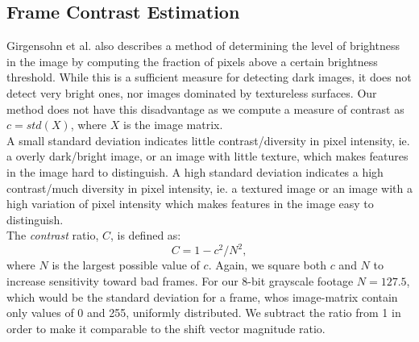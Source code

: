 \subsection{Frame Contrast Estimation}\label{sec:frame_contrast_estimation}
%
Girgensohn et al.\cite{Girgensohn:2000:SAH:354401.354415} also describes a method of determining the level of brightness in the image by computing the fraction of pixels above a certain brightness threshold. While this is a sufficient measure for detecting dark images, it does not detect very bright ones, nor images dominated by textureless surfaces. Our method does not have this disadvantage as we compute a measure of contrast as $c = std(X)$, where $X$ is the image matrix.\\
A small standard deviation indicates little contrast/diversity in pixel intensity, ie. a overly dark/bright image, or an image with little texture, which makes features in the image hard to distinguish. A high standard deviation indicates a high contrast/much diversity in pixel intensity, ie. a textured image or an image with a high variation of pixel intensity which makes features in the image easy to distinguish.\\
%
The \textit{contrast} ratio, $C$, is defined as:
\[
C = 1 - c^2 / N^2,
\]
where $N$ is the largest possible value of $c$. Again, we square both $c$ and $N$ to increase sensitivity toward bad frames. For our 8-bit grayscale footage $N = 127.5$, which would be the standard deviation for a frame, whos image-matrix contain only values of 0 and 255, uniformly distributed. We subtract the ratio from 1 in order to make it comparable to the shift vector magnitude ratio.\\
%
